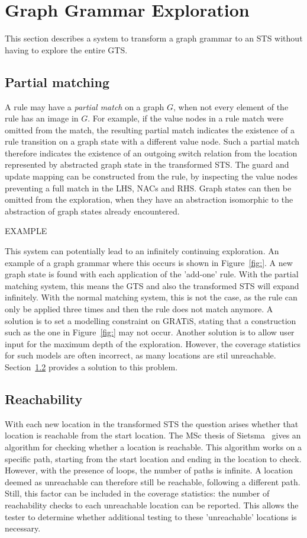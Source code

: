 \section{Graph Grammar Exploration}\label{sec:gg-exploration}

This section describes a system to transform a graph grammar to an STS without having to explore the entire GTS.

\subsection{Partial matching}\label{sec:partial-matching}
A rule may have a \textit{partial match} on a graph $G$, when not every element of the rule has an image in $G$. For example, if the value nodes in a rule match were omitted from the match, the resulting partial match indicates the existence of a rule transition on a graph state with a different value node. Such a partial match therefore indicates the existence of an outgoing switch relation from the location represented by abstracted graph state in the transformed STS. The guard and update mapping can be constructed from the rule, by inspecting the value nodes preventing a full match in the LHS, NACs and RHS. Graph states can then be omitted from the exploration, when they have an abstraction isomorphic to the abstraction of graph states already encountered.

EXAMPLE

This system can potentially lead to an infinitely continuing exploration. An example of a graph grammar where this occurs is shown in Figure~\ref{fig:}. A new graph state is found with each application of the 'add-one' rule. With the partial matching system, this means the GTS and also the transformed STS will expand infinitely. With the normal matching system, this is not the case, as the rule can only be applied three times and then the rule does not match anymore. A solution is to set a modelling constraint on GRATiS, stating that a construction such as the one in Figure~\ref{fig:} may not occur. Another solution is to allow user input for the maximum depth of the exploration. However, the coverage statistics for such models are often incorrect, as many locations are stil unreachable. Section~\ref{sec:reachability} provides a solution to this problem. 

\subsection{Reachability}\label{sec:reachability}
With each new location in the transformed STS the question arises whether that location is reachable from the start location. The MSc thesis of Sietsma~\cite{Sietsma:reachability} gives an algorithm for checking whether a location is reachable. This algorithm works on a specific path, starting from the start location and ending in the location to check. However, with the presence of loops, the number of paths is infinite. A location deemed as unreachable can therefore still be reachable, following a different path. Still, this factor can be included in the coverage statistics: the number of reachability checks to each unreachable location can be reported. This allows the tester to determine whether additional testing to these 'unreachable' locations is necessary.
